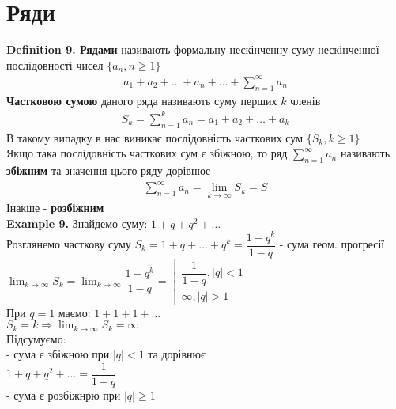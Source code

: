 \documentclass[a4paper, 14pt]{extarticle}
\def\huge{\displaystyle}
\def\bigline{\vspace{5mm}\\}
\def\defin#1{\textbf{Definition {#1}}}
\def\ex#1{\textbf{Example {#1}}}
\def\bigline{\vspace{5mm}\\}
\begin{document}
\section{Ряди}
\defin{9. Рядами} називають формальну нескінченну суму нескінченної послідовності чисел $\{a_n, n \geq 1\}$
\begin{align*}
a_1 + a_2 + \dots + a_n + \dots + \huge \sum_{n=1}^{\infty} a_n
\end{align*}
\textbf{Частковою сумою} даного ряда називають суму перших $k$ членів
\begin{align*}
S_k = \sum_{n=1}^k a_n = a_1 + a_2 + \dots + a_k
\end{align*}
В такому випадку в нас виникає послідовність часткових сум $\{S_k, k \geq 1\}$\\
Якщо така послідовність часткових сум є збіжною, то ряд $\huge \sum_{n=1}^{\infty} a_n$ називають \textbf{збіжним} та значення цього ряду дорівнює
\begin{align*}
\sum_{n=1}^{\infty} a_n = \lim_{k \to \infty} S_k = S
\end{align*}
Інакше - \textbf{розбіжним}
\bigline
\ex{9.} Знайдемо суму: $1 + q + q^2 + \dots$\\
Розглянемо часткову суму $S_k = 1 + q + \dots + q^k = \dfrac{1 - q^k}{1 - q}$ - сума геом. прогресії\\
$\huge \lim_{k \to \infty} S_k = \lim_{k \to \infty} \dfrac{1-q^k}{1 - q} = \left[ \begin{gathered} \dfrac{1}{1-q}, |q|<1 \\ \infty, |q|>1 \end{gathered} \right.$
\\
При $q = 1$ маємо: $1 + 1 + 1 + \dots$\\
$S_k = k \Rightarrow \huge \lim_{k \to \infty} S_k = \infty$\\
Підсумуємо:\\
- сума є збіжною при $|q| < 1$ та дорівнює\\
$1 + q + q^2 + \dots = \dfrac{1}{1-q}$\\
- сума є розбіжнрю при $|q| \geq 1$
\bigline
\end{document}

